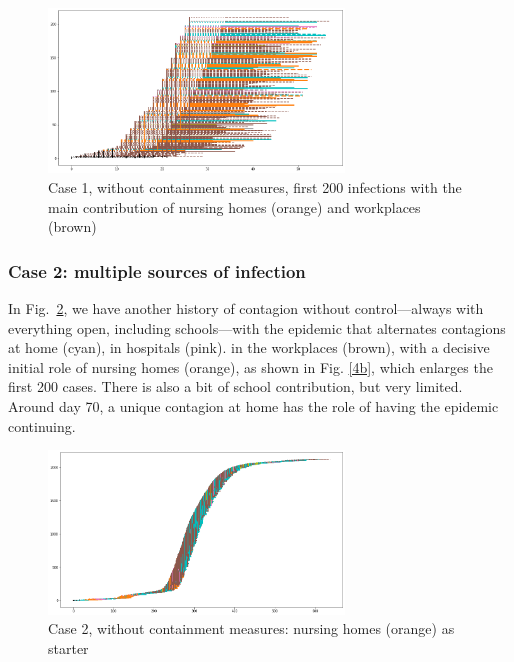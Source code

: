 \documentclass[11pt]{article}
\begin{document}
\begin{figure}[H]
\begin{center}
\includegraphics[width=0.7\textwidth]{no3b.png} %
\caption{Case 1, without containment measures, first 200 infections with the main contribution of nursing homes (orange) and workplaces (brown)}
\label{3b}
\end{center}
\end{figure}

\subsubsection{Case 2: multiple sources of infection}
\label{c2}

In Fig.~\ref{4a}, we have another history of contagion without control---always with everything open, including schools---with the epidemic that alternates contagions at home (cyan), in hospitals (pink). in the workplaces (brown), with a decisive initial role of nursing homes (orange), as shown in Fig. \ref{4b}, which enlarges the first 200 cases. There is also a bit of school contribution, but very limited. Around day 70, a unique contagion at home has the role of having the epidemic continuing.

\begin{figure}[H]
\begin{center}
\includegraphics[width=0.7\textwidth]{no4a.png}%

\caption{Case 2, without containment measures: nursing homes (orange) as starter}
\label{4a}
\end{center}
\end{figure}
\end{document}
